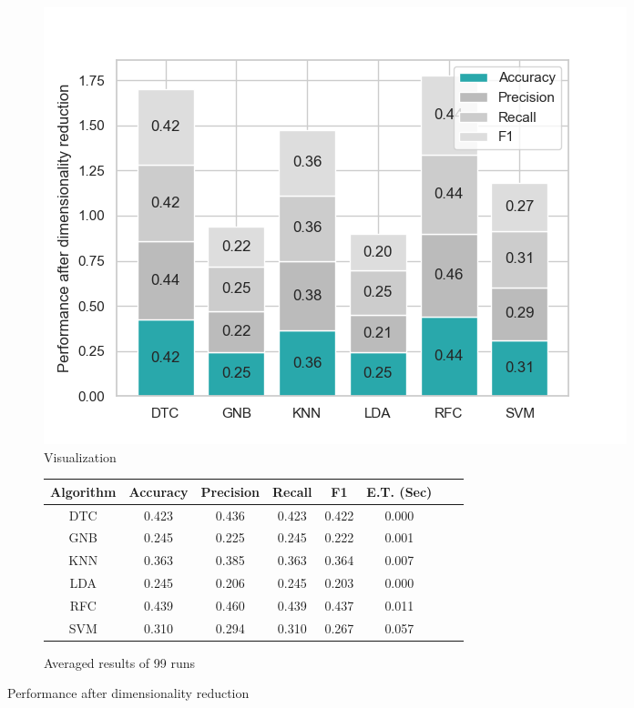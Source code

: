 \documentclass[conference,onecolumn]{IEEEtran}
\begin{document}
        \begin{figure}[H]
            \centering
            \begin{subfigure}{0.45\textwidth}
                \centering
                \includegraphics[width=\linewidth]{Plots/Performance_after_dimensionality_reduction.png}
                \caption{Visualization}
                \label{fig:performanceAfterDimensionalityReduction}
            \end{subfigure}%
            \begin{subfigure}{0.55\textwidth}
                \centering
                \small
                \begin{tabular}{|c|c|c|c|c|c|c|c|}
                    \hline
                        \textbf{Algorithm} &\textbf{Accuracy} &\textbf{Precision} &\textbf{Recall} &\textbf{F1} &\textbf{E.T. (Sec)} \\ \hline
                        \hline
                        DTC    & 0.423   & 0.436   & 0.423  & 0.422   & 0.000 \\ \hline
                        GNB    & 0.245   & 0.225   & 0.245  & 0.222   & 0.001 \\ \hline
                        KNN    & 0.363   & 0.385   & 0.363  & 0.364   & 0.007 \\ \hline
                        LDA    & 0.245   & 0.206   & 0.245  & 0.203   & 0.000 \\ \hline
                        RFC    & 0.439   & 0.460   & 0.439  & 0.437   & 0.011 \\ \hline
                        SVM    & 0.310   & 0.294   & 0.310  & 0.267   & 0.057 \\                    
                    \hline
                \end{tabular}
                \caption{Averaged results of 99 runs}
                \label{tab:performanceAfterDimensionalityReduction}
            \end{subfigure}
            \caption{Performance after dimensionality reduction}
        \end{figure}
\end{document}
